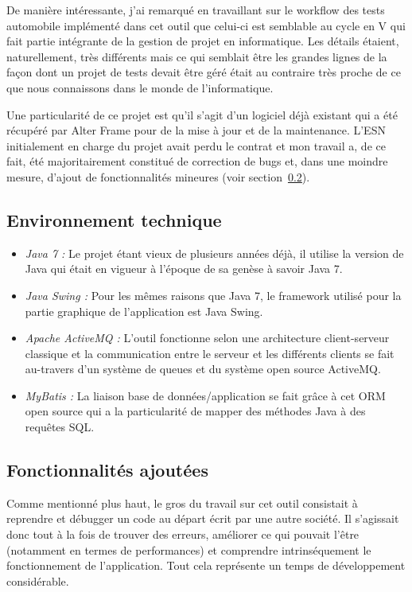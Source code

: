 De manière intéressante, j'ai remarqué en travaillant sur le workflow des tests automobile implémenté dans cet outil que celui-ci est semblable au cycle en V qui fait partie intégrante de la gestion de projet en informatique. Les détails étaient, naturellement, très différents mais ce qui semblait être les grandes lignes de la façon dont un projet de tests devait être géré était au contraire très proche de ce que nous connaissons dans le monde de l'informatique.

Une particularité de ce projet est qu'il s'agit d'un logiciel déjà existant qui a été récupéré par Alter Frame pour de la mise à jour et de la maintenance. L'ESN initialement en charge du projet avait perdu le contrat et mon travail a, de ce fait, été majoritairement constitué de correction de bugs et, dans une moindre mesure, d'ajout de fonctionnalités mineures (voir section~\ref{subsec:ajout}).

\subsection{Environnement technique}
\begin{itemize}
	\item \emph{Java 7 :} Le projet étant vieux de plusieurs années déjà, il utilise la version de Java qui était en vigueur à l'époque de sa genèse à savoir Java 7.
	\item \emph{Java Swing\cite{swing_wiki} :} Pour les mêmes raisons que Java 7, le framework utilisé pour la partie graphique de l'application est Java Swing.
	\item \emph{Apache ActiveMQ\cite{activemq} :} L'outil fonctionne selon une architecture client-serveur classique et la communication entre le serveur et les différents clients se fait au-travers d'un système de queues et du système open source ActiveMQ.
	\item \emph{MyBatis\cite{mybatis} :} La liaison base de données/application se fait grâce à cet ORM open source qui a la particularité de mapper des méthodes Java à des requêtes SQL\cite{mybatis_prez}.
\end{itemize}

\subsection{Fonctionnalités ajoutées}
\label{subsec:ajout}
Comme mentionné plus haut, le gros du travail sur cet outil consistait à reprendre et débugger un code au départ écrit par une autre société. Il s'agissait donc tout à la fois de trouver des erreurs, améliorer ce qui pouvait l'être (notamment en termes de performances) et comprendre intrinséquement le fonctionnement de l'application. Tout cela représente un temps de développement considérable.

